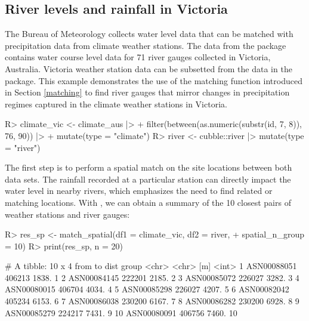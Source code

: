 \documentclass[
  shortnames]{jss}
\begin{document}
\hypertarget{river-levels-and-rainfall-in-victoria}{%
\subsection{River levels and rainfall in Victoria}\label{river-levels-and-rainfall-in-victoria}}

The Bureau of Meteorology collects water level data that can be matched with precipitation data from climate weather stations. The data  from the  package contains water course level data for 71 river gauges collected in Victoria, Australia. Victoria weather station data can be subsetted from the  data in the  package. This example demonstrates the use of the matching function introduced in Section \ref{matching} to find river gauges that mirror changes in precipitation regimes captured in the climate weather stations in Victoria.

\begin{CodeChunk}
\begin{CodeInput}
R> climate_vic <- climate_aus |>
+   filter(between(as.numeric(substr(id, 7, 8)), 76, 90)) |>
+   mutate(type = "climate")
R> river <- cubble::river |> mutate(type = "river") 
\end{CodeInput}
\end{CodeChunk}

The first step is to perform a spatial match on the site locations between both data sets. The rainfall recorded at a particular station can directly impact the water level in nearby rivers, which emphasizes the need to find related or matching locations. With , we can obtain a summary of the 10 closest pairs of weather stations and river gauges:

\begin{CodeChunk}
\begin{CodeInput}
R> res_sp <- match_spatial(df1 = climate_vic, df2 = river, 
+                         spatial_n_group = 10)
R> print(res_sp, n = 20)
\end{CodeInput}
\begin{CodeOutput}
# A tibble: 10 x 4
   from        to      dist group
   <chr>       <chr>    [m] <int>
 1 ASN00088051 406213 1838.     1
 2 ASN00084145 222201 2185.     2
 3 ASN00085072 226027 3282.     3
 4 ASN00080015 406704 4034.     4
 5 ASN00085298 226027 4207.     5
 6 ASN00082042 405234 6153.     6
 7 ASN00086038 230200 6167.     7
 8 ASN00086282 230200 6928.     8
 9 ASN00085279 224217 7431.     9
10 ASN00080091 406756 7460.    10
\end{CodeOutput}
\end{CodeChunk}
\end{document}
